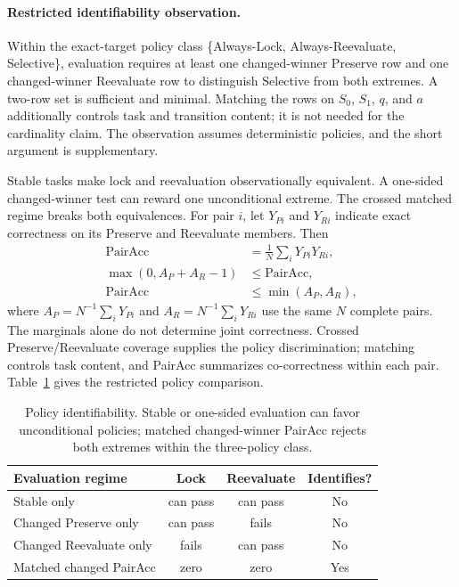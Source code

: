 \documentclass[letterpaper]{article}
\begin{document}
\paragraph{Restricted identifiability observation.}
Within the exact-target policy class \{Always-Lock, Always-Reevaluate, Selective\}, evaluation
requires at least one changed-winner Preserve row and one changed-winner Reevaluate row to
distinguish Selective from both extremes. A two-row set is sufficient and minimal. Matching the
rows on $S_0$, $S_1$, $q$, and $a$ additionally controls task and transition content; it is not
needed for the cardinality claim. The observation assumes deterministic policies, and the short
argument is supplementary.

Stable tasks make lock and reevaluation observationally equivalent. A one-sided changed-winner
test can reward one unconditional extreme. The crossed matched regime breaks both equivalences.
For pair $i$, let $Y_{Pi}$ and $Y_{Ri}$ indicate exact correctness on its Preserve and Reevaluate
members. Then
\begin{equation}
\begin{aligned}
\mathrm{PairAcc}&=\frac{1}{N}\sum_i Y_{Pi}Y_{Ri},\\
\max(0,A_P+A_R-1)&\leq\mathrm{PairAcc},\\
\mathrm{PairAcc}&\leq\min(A_P,A_R),
\end{aligned}
\end{equation}
where $A_P=N^{-1}\sum_iY_{Pi}$ and $A_R=N^{-1}\sum_iY_{Ri}$ use the same $N$ complete
pairs. The marginals alone do not determine joint correctness. Crossed Preserve/Reevaluate
coverage supplies the policy discrimination; matching controls task content, and PairAcc
summarizes co-correctness within each pair.
Table~\ref{tab:policy-identifiability} gives the restricted policy comparison.

\begin{table}[t]
\centering
\small
\begin{tabular}{@{}lccc@{}}
\toprule
Evaluation regime & Lock & Reevaluate & Identifies? \\
\midrule
Stable only & can pass & can pass & No \\
Changed Preserve only & can pass & fails & No \\
Changed Reevaluate only & fails & can pass & No \\
Matched changed PairAcc & zero & zero & Yes \\
\bottomrule
\end{tabular}
\caption{Policy identifiability. Stable or one-sided evaluation can favor unconditional policies;
matched changed-winner PairAcc rejects both extremes within the three-policy class.}
\label{tab:policy-identifiability}
\end{table}
\end{document}
